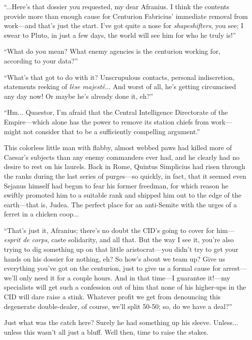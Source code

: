 ``...Here's that dossier you requested, my dear Afranius. I think the contents provide more than enough cause for Centurion Fabricius' immediate removal from work---and that's just the start. I've got quite a nose for \emph{shapeshifters}, you see; I swear to Pluto, in just a few days, the world will see him for who he truly is!''

``What do you mean? What enemy agencies is the centurion working for, according to your data?''

``What's that got to do with it? Unscrupulous contacts, personal indiscretion, statements reeking of \emph{lèse majesté}... And worst of all, he's getting circumcised any day now! Or maybe he's already done it, eh?''

``Hm... Quaestor, I'm afraid that the Central Intelligence Directorate of the Empire---which alone has the power to remove its station chiefs from work---might not consider that to be a sufficiently compelling argument.''

This colorless little man with flabby, almost webbed paws had killed more of Caesar's subjects than any enemy commanders ever had, and he clearly had no desire to rest on his laurels. Back in Rome, Quintus Simplicius had risen through the ranks during the last series of purges---so quickly, in fact, that it seemed even Sejanus himself had begun to fear his former freedman, for which reason he swiftly promoted him to a suitable rank and shipped him out to the edge of the earth---that is, Judea. The perfect place for an anti-Semite with the urges of a ferret in a chicken coop...

``That's just it, Afranius; there's no doubt the CID's going to cover for him---\emph{esprit de corps}, caste solidarity, and all that. But the way I see it, you're also trying to dig something up on that little aristocrat---you didn't try to get your hands on his dossier for nothing, eh? So how's about we team up? Give us everything you've got on the centurion, just to give us a formal cause for arrest---we'll only need it for a couple hours. And in that time---I guarantee it!---my specialists will get such a confession out of him that none of his higher-ups in the CID will dare raise a stink. Whatever profit we get from denouncing this degenerate double-dealer, of course, we'll split 50-50; so, do we have a deal?''

Just what was the catch here? Surely he had something up his sleeve. Unless... unless this wasn't all just a bluff. Well then, time to raise the stakes.

